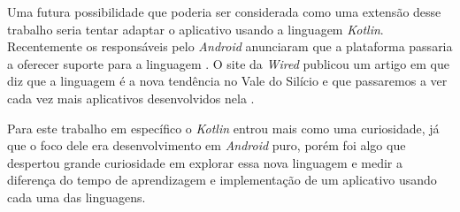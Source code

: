 \documentclass[hidelinks,12pt]{article}
\begin{document}
Uma futura possibilidade que poderia ser considerada como uma extens\~ao desse trabalho seria tentar adaptar o aplicativo usando a linguagem \textit{Kotlin}. Recentemente os respons\'aveis pelo \textit{Android} anunciaram que a plataforma passaria a oferecer suporte para a linguagem \cite{kotlin:and_adopt}. O site da \textit{Wired} publicou um artigo em que diz que a linguagem \'e a nova tendência no Vale do Sil\'icio e que passaremos a ver cada vez mais aplicativos desenvolvidos nela \cite{kotlin:wired}.

Para este trabalho em espec\'ifico o \textit{Kotlin} entrou mais como uma curiosidade, j\'a que o foco dele era desenvolvimento em \textit{Android} puro, por\'em foi algo que despertou grande curiosidade em explorar essa nova linguagem e medir a diferen\c{c}a do tempo de aprendizagem e implementa\c{c}\~ao de um aplicativo usando cada uma das linguagens.
\newpage
\end{document}
